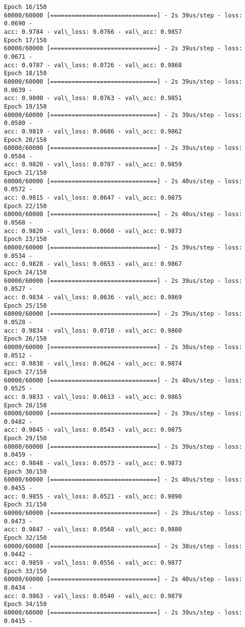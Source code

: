 \documentclass[11pt]{article}
\begin{document}
\begin{Verbatim}[commandchars=\\\{\}]
Epoch 16/150
60000/60000 [==============================] - 2s 39us/step - loss: 0.0690 -
acc: 0.9784 - val\_loss: 0.0766 - val\_acc: 0.9857
Epoch 17/150
60000/60000 [==============================] - 2s 39us/step - loss: 0.0671 -
acc: 0.9787 - val\_loss: 0.0726 - val\_acc: 0.9868
Epoch 18/150
60000/60000 [==============================] - 2s 39us/step - loss: 0.0639 -
acc: 0.9800 - val\_loss: 0.0763 - val\_acc: 0.9851
Epoch 19/150
60000/60000 [==============================] - 2s 39us/step - loss: 0.0580 -
acc: 0.9819 - val\_loss: 0.0686 - val\_acc: 0.9862
Epoch 20/150
60000/60000 [==============================] - 2s 39us/step - loss: 0.0584 -
acc: 0.9820 - val\_loss: 0.0707 - val\_acc: 0.9859
Epoch 21/150
60000/60000 [==============================] - 2s 40us/step - loss: 0.0572 -
acc: 0.9815 - val\_loss: 0.0647 - val\_acc: 0.9875
Epoch 22/150
60000/60000 [==============================] - 2s 40us/step - loss: 0.0568 -
acc: 0.9820 - val\_loss: 0.0660 - val\_acc: 0.9873
Epoch 23/150
60000/60000 [==============================] - 2s 39us/step - loss: 0.0534 -
acc: 0.9828 - val\_loss: 0.0653 - val\_acc: 0.9867
Epoch 24/150
60000/60000 [==============================] - 2s 39us/step - loss: 0.0527 -
acc: 0.9834 - val\_loss: 0.0636 - val\_acc: 0.9869
Epoch 25/150
60000/60000 [==============================] - 2s 39us/step - loss: 0.0528 -
acc: 0.9834 - val\_loss: 0.0710 - val\_acc: 0.9860
Epoch 26/150
60000/60000 [==============================] - 2s 38us/step - loss: 0.0512 -
acc: 0.9838 - val\_loss: 0.0624 - val\_acc: 0.9874
Epoch 27/150
60000/60000 [==============================] - 2s 40us/step - loss: 0.0525 -
acc: 0.9833 - val\_loss: 0.0613 - val\_acc: 0.9865
Epoch 28/150
60000/60000 [==============================] - 2s 39us/step - loss: 0.0482 -
acc: 0.9845 - val\_loss: 0.0543 - val\_acc: 0.9875
Epoch 29/150
60000/60000 [==============================] - 2s 39us/step - loss: 0.0459 -
acc: 0.9848 - val\_loss: 0.0573 - val\_acc: 0.9873
Epoch 30/150
60000/60000 [==============================] - 2s 40us/step - loss: 0.0455 -
acc: 0.9855 - val\_loss: 0.0521 - val\_acc: 0.9890
Epoch 31/150
60000/60000 [==============================] - 2s 39us/step - loss: 0.0473 -
acc: 0.9847 - val\_loss: 0.0568 - val\_acc: 0.9880
Epoch 32/150
60000/60000 [==============================] - 2s 38us/step - loss: 0.0442 -
acc: 0.9859 - val\_loss: 0.0556 - val\_acc: 0.9877
Epoch 33/150
60000/60000 [==============================] - 2s 40us/step - loss: 0.0434 -
acc: 0.9863 - val\_loss: 0.0540 - val\_acc: 0.9879
Epoch 34/150
60000/60000 [==============================] - 2s 39us/step - loss: 0.0415 -

\end{Verbatim}
\end{document}

